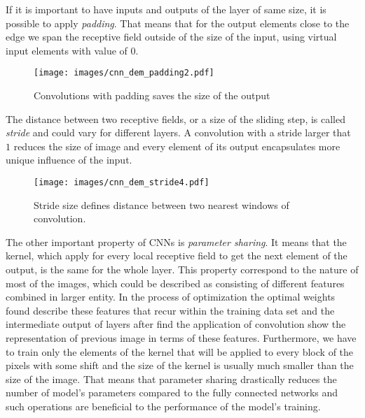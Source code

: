 If it is important to have inputs and outputs of the layer of same size, it is possible to apply \emph{padding}.
That means that for the output elements close to the edge we span the receptive field outside of the size of the input, using virtual input elements with value of $0$. 
\begin{figure}[ht]
	\centering
	\texttt{[image: images/cnn\_dem\_padding2.pdf]}
	\caption{Convolutions with padding saves the size of the output}
	\label{fig:padding_demo}
\end{figure}
\medskip

The distance between two receptive fields, or a size of the sliding step,  is called \textit{stride} and could vary for different layers.
A convolution with a stride larger that $1$ reduces the size of image and every element of its output encapsulates more unique influence of the input. 
\begin{figure}[ht]
	\centering
	\texttt{[image: images/cnn\_dem\_stride4.pdf]}
	\caption{Stride size defines distance between two nearest windows of convolution.}
	\label{fig:stride_demo}
\end{figure}
\medskip


The other important property of CNNs is \emph{parameter sharing}. 
It means that the kernel, which apply for every local receptive field to get the next element of the output, is the same for the whole layer. 
This property correspond to the nature of most of the images, which could be described as consisting of different features combined in larger entity.
In the process of optimization the optimal weights found describe these features that recur within the training data set and the intermediate output of layers after find the application of convolution show the representation of previous image in terms of these features.
Furthermore, we have to train only the elements of the kernel that will be applied to every block of the pixels with some shift and the size of the kernel is usually much smaller than the size of the image.
That means that parameter sharing drastically reduces the number of model's parameters compared to the fully connected networks and such operations are beneficial to the performance of the model's training.
\medskip


